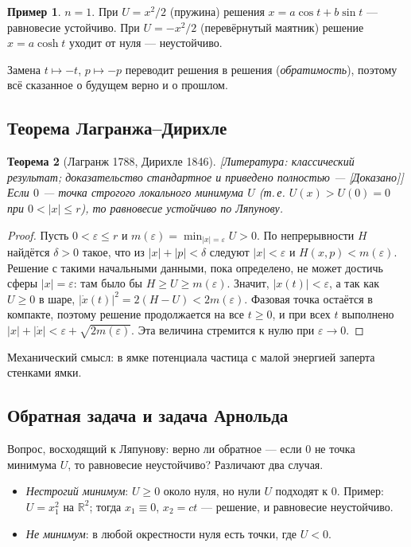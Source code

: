 \documentclass[11pt,a4paper]{article}
\newtheorem{theorem}{Теорема}[section]
\theoremstyle{definition}
\newtheorem{example}[theorem]{Пример}
\newcommand{\R}{\mathbb R}
\newcommand{\eps}{\varepsilon}
\newcommand{\mk}[1]{\textsf{[#1]}}
\newcommand{\term}[1]{\emph{#1}}
\begin{document}
\begin{example}
$n=1$. При $U=x^2/2$ (пружина) решения $x=a\cos t+b\sin t$ --- равновесие устойчиво.
При $U=-x^2/2$ (перевёрнутый маятник) решение $x=a\cosh t$ уходит от нуля --- неустойчиво.
\end{example}

Замена $t\mapsto-t$, $p\mapsto-p$ переводит решения в решения (\term{обратимость}), поэтому всё
сказанное о будущем верно и о прошлом.

\subsection{Теорема Лагранжа--Дирихле}

\begin{theorem}[Лагранж 1788, Дирихле 1846]\label{thm:LD}
\mk{Литература: классический результат; доказательство стандартное и приведено полностью ---
\mk{Доказано}} Если $0$ --- точка \term{строгого локального минимума} $U$ (т.\,е. $U(x)>U(0)=0$
при $0<|x|\le r$), то равновесие устойчиво по Ляпунову.
\end{theorem}
\begin{proof}
Пусть $0<\eps\le r$ и $m(\eps)=\min_{|x|=\eps}U>0$. По непрерывности $H$ найдётся $\delta>0$
такое, что из $|x|+|p|<\delta$ следуют $|x|<\eps$ и $H(x,p)<m(\eps)$. Решение с такими
начальными данными, пока определено, не может достичь сферы $|x|=\eps$: там было бы
$H\ge U\ge m(\eps)$. Значит, $|x(t)|<\eps$, а так как $U\ge0$ в шаре, $|\dot x(t)|^2=2(H-U)<2m(\eps)$.
Фазовая точка остаётся в компакте, поэтому решение продолжается на все $t\ge0$, и при всех $t$
выполнено $|x|+|\dot x|<\eps+\sqrt{2m(\eps)}$. Эта величина стремится к нулю при $\eps\to0$.
\end{proof}

Механический смысл: в ямке потенциала частица с малой энергией заперта стенками ямки.

\subsection{Обратная задача и задача Арнольда}

Вопрос, восходящий к Ляпунову: верно ли обратное --- если $0$ не точка минимума $U$, то
равновесие неустойчиво? Различают два случая.

\begin{itemize}[leftmargin=*]
\item \term{Нестрогий минимум}: $U\ge0$ около нуля, но нули $U$ подходят к $0$. Пример:
$U=x_1^2$ на $\R^2$; тогда $x_1\equiv0$, $x_2=ct$ --- решение, и равновесие неустойчиво.
\item \term{Не минимум}: в любой окрестности нуля есть точки, где $U<0$.
\end{itemize}
\end{document}
